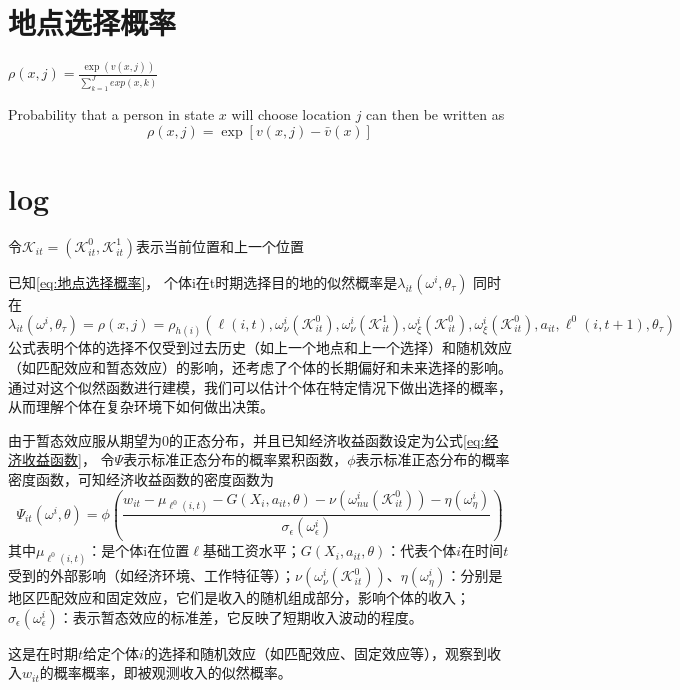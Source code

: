 \documentclass[a4paper,12pt,oneside, fontset=mac]{ctexbook} %
\begin{document}
\chapter{地点选择概率}
$\rho(x,j)=\frac{\exp(v(x,j))}{\sum\limits_{k=1}^{J} exp(x,k)}$

Probability that a person in state $x$ will choose location $j$ can then be written as
$$\rho(x,j)=\exp[v(x,j)-\bar v(x)]$$

\chapter{log} %

令$\mathcal{K}_{it}=(\mathcal{K}_{it}^{0},\mathcal{K}_{it}^{1})$表示当前位置和上一个位置

已知\ref{eq:地点选择概率}，
个体i在t时期选择目的地的似然概率是$\lambda_{it}(\omega^{i},\theta_{\tau})$
同时在
\begin{equation}
  \lambda_{it}(\omega^{i},\theta_{\tau})=\rho(x,j)=\rho_{h(i)}(\ell(i,t),\omega_{\nu}^{i}(\mathcal{K}_{it}^{0}),\omega_{\nu}^{i}(\mathcal{K}_{it}^{1}),\omega_{\xi}^{i}(\mathcal{K}_{it}^{0}),\omega_{\xi}^{i}(\mathcal{K}_{it}^{0}),a_{it},\ell^{0}(i,t+1),\theta_{\tau})
\end{equation}
公式表明个体的选择不仅受到过去历史（如上一个地点和上一个选择）和随机效应（如匹配效应和暂态效应）的影响，还考虑了个体的长期偏好和未来选择的影响。
通过对这个似然函数进行建模，我们可以估计个体在特定情况下做出选择的概率，从而理解个体在复杂环境下如何做出决策。


由于暂态效应服从期望为$0$的正态分布，并且已知经济收益函数设定为公式\ref{eq:经济收益函数}，
令$\Psi$表示标准正态分布的概率累积函数，$\phi$表示标准正态分布的概率密度函数，可知经济收益函数的密度函数为
\begin{equation}
  \Psi_{it}(\omega^{i},\theta)=\phi(\frac{w_{it} - \mu_{\ell^{0}(i,t)}-G(X_{i},a_{it},\theta)-\nu(\omega_{nu}^{i}(\mathcal{K}_{it}^{0}))-\eta(\omega_{\eta}^{i})  }{\sigma_{\epsilon}(\omega_{\epsilon}^{i})})
\end{equation}
其中$\mu_{\ell^{0}(i,t)}$：是个体i在位置$\ell$基础工资水平；$G(X_i, a_{it}, \theta)$：代表个体$i$在时间$t$受到的外部影响（如经济环境、工作特征等）；$\nu(\omega_{\nu}^i(\mathcal{K}_{it}^0))$、$\eta(\omega_{\eta}^i)$：分别是地区匹配效应和固定效应，它们是收入的随机组成部分，影响个体的收入；$\sigma_{\epsilon}(\omega_{\epsilon}^i)$：表示暂态效应的标准差，它反映了短期收入波动的程度。

这是在时期$t$给定个体$i$的选择和随机效应（如匹配效应、固定效应等），观察到收入$w_{it}$的概率概率，即被观测收入的似然概率。
\end{document}
